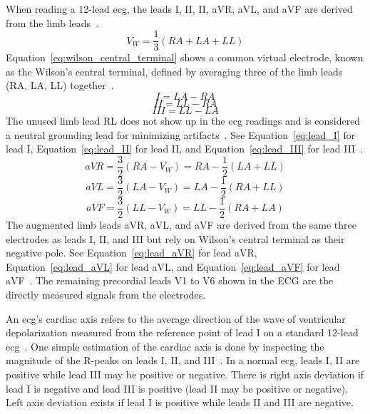 \documentclass[\main/thesis.tex]{subfiles}
\begin{document}
When reading a 12-lead \gls{ecg}, the leads I, II, II, aVR, aVL, and aVF are derived from the limb leads~\cite{goldberger_simple_1942}.
\begin{equation}
    V_W = \dfrac{1}{3}(RA + LA + LL) \label{eq:wilson_central_terminal}
\end{equation}
Equation~\ref{eq:wilson_central_terminal} shows a common virtual electrode, known as the Wilson's central terminal, defined by averaging three of the limb leads (RA, LA, LL) together~\cite{goldberger_simple_1942}.
\begin{equation}
    I = LA - RA \label{eq:lead_I}
\end{equation}
\begin{equation}
    II = LL - RA \label{eq:lead_II}
\end{equation}
\begin{equation}
    III = LL - LA \label{eq:lead_III}
\end{equation}
The unused limb lead RL does not show up in the \gls{ecg} readings and is considered a neutral grounding lead for minimizing artifacts~\cite{ecg-lead-positioning}.
See Equation~\ref{eq:lead_I} for lead I, Equation~\ref{eq:lead_II} for lead II, and Equation~\ref{eq:lead_III} for lead III~\cite{goldberger_simple_1942}.
\begin{equation}
    aVR = \dfrac{3}{2}(RA - V_W) = RA - \dfrac{1}{2}(LA + LL) \label{eq:lead_aVR}
\end{equation}
\begin{equation}
    aVL = \dfrac{3}{2}(LA - V_W) = LA - \dfrac{1}{2}(RA + LL) \label{eq:lead_aVL}
\end{equation}
\begin{equation}
    aVF = \dfrac{3}{2}(LL - V_W) = LL - \dfrac{1}{2}(RA + LA) \label{eq:lead_aVF}
\end{equation}
The augmented limb leads aVR, aVL, and aVF are derived from the same three electrodes as leads I, II, and III but rely on Wilson's central terminal as their negative pole.
See Equation~\ref{eq:lead_aVR} for lead aVR, Equation~\ref{eq:lead_aVL} for lead aVL, and Equation~\ref{eq:lead_aVF} for lead aVF~\cite{goldberger_simple_1942}.
The remaining precordial leads V1 to V6 shown in the ECG are the directly measured signals from the electrodes.

An \gls{ecg}'s cardiac axis refers to the average direction of the wave of ventricular depolarization measured from the reference point of lead I on a standard 12-lead \gls{ecg}~\cite{meek_introduction_2002}.
One simple estimation of the cardiac axis is done by inspecting the magnitude of the R-peaks on leads I, II, and III~\cite{ecg-left-axis-deviation}.
In a normal \gls{ecg}, leads I, II are positive while lead III may be positive or negative.
There is right axis deviation if lead I is negative and lead III is positive (lead II may be positive or negative).
Left axis deviation exists if lead I is positive while leads II and III are negative.
\end{document}

